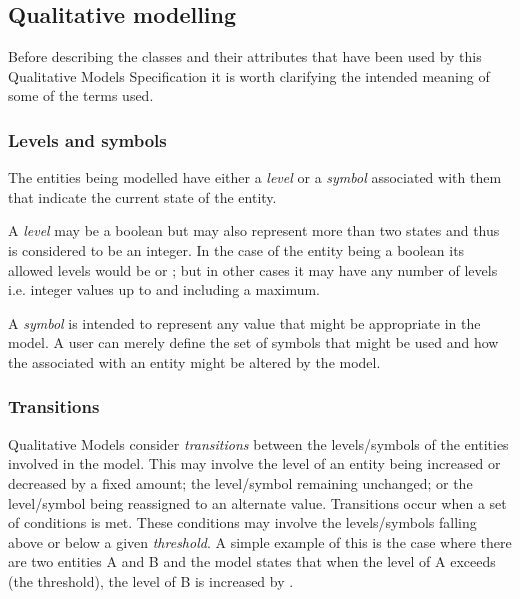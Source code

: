 \subsection{Qualitative modelling}
\label{qual}

Before describing the classes and their attributes that have been used by this Qualitative Models Specification it is worth clarifying the intended meaning of some of the terms used. 

\subsubsection{Levels and symbols}

The entities being modelled have either a \emph{level} or a \emph{symbol} associated with them that indicate the current state of the entity. 

A \emph{level} may be a boolean but may also represent more than two states and thus is considered to be an integer. In the case of the entity being a boolean its allowed levels would be  or ; but in other cases it may have any number of levels i.e. integer values up to and including a maximum. 

A \emph{symbol} is intended to represent any value that might be appropriate in the model.  A user can merely define the set of symbols that might be used and how the  associated with an entity might be altered  by the model. 


\subsubsection{Transitions}

Qualitative Models consider \emph{transitions} between the levels/symbols of the entities involved in the model. This may involve the level of an entity being increased or decreased by a fixed amount; the level/symbol remaining unchanged; or the level/symbol being reassigned to an alternate value. Transitions occur when a set of conditions is met. These conditions may involve the levels/symbols falling above or below  a given \emph{threshold}. A simple example of this is the case where there are two entities A and B and the model states that when the level of A exceeds  (the threshold), the level of B is increased by . 


